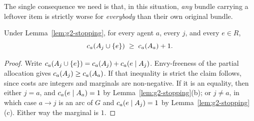 The single consequence we need is that, in this situation, \emph{any} bundle
carrying a leftover item is strictly worse for \emph{everybody} than their
own original bundle.

\begin{lemma}
\label{lem:g2-expensive}
Under Lemma~\ref{lem:g2-stopping}, for every agent $a$, every $j$, and every
$e \in R$,
\[
  c_a(A_{j} \cup \left\{e\right\}) \;\ge\; c_a(A_{a}) + 1 .
\]
\end{lemma}
\begin{proof}
Write $c_a(A_{j} \cup \left\{e\right\}) = c_a(A_{j}) + c_a(e \mid
A_{j})$. Envy-freeness of the partial allocation gives $c_a(A_{j}) \ge c_a(A_{a})$. If that inequality is strict the claim follows,
since costs are integers and marginals are non-negative. If it is an
equality, then either $j = a$, and $c_a(e \mid A_{a}) = 1$ by
Lemma~\ref{lem:g2-stopping}(b); or $j \ne a$, in which case $a \to j$ is an arc of
$G$ and $c_a(e \mid A_{j}) = 1$ by Lemma~\ref{lem:g2-stopping}(c). Either
way the marginal is $1$.
\end{proof}


